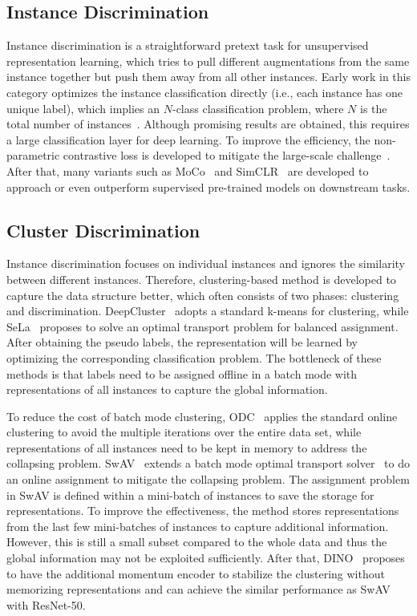 \documentclass[10pt,twocolumn,letterpaper]{article}
\begin{document}
\subsection{Instance Discrimination}
Instance discrimination is a straightforward pretext task for unsupervised representation learning, which tries to pull different augmentations from the same instance together but push them away from all other instances. Early work in this category optimizes the instance classification directly (i.e., each instance has one unique label), which implies an $N$-class classification problem, where $N$ is the total number of instances~\cite{DosovitskiyFSRB16}. Although promising results are obtained, this requires a large classification layer for deep learning. To improve the efficiency, the non-parametric contrastive loss is developed to mitigate the large-scale challenge~\cite{WuXYL18}. After that, many variants such as MoCo~\cite{He0WXG20,abs-2003-04297,abs-2104-02057} and SimCLR~\cite{ChenK0H20} are developed to approach or even outperform supervised pre-trained models on downstream tasks.

\subsection{Cluster Discrimination}
Instance discrimination focuses on individual instances and ignores the similarity between different instances. Therefore, clustering-based method is developed to capture the data structure better, which often consists of two phases: clustering and discrimination. DeepCluster~\cite{CaronBJD18} adopts a standard k-means for clustering, while SeLa~\cite{AsanoRV20a} proposes to solve an optimal transport problem for balanced assignment. After obtaining the pseudo labels, the representation will be learned by optimizing the corresponding classification problem. The bottleneck of these methods is that labels need to be assigned offline in a batch mode with representations of all instances to capture the global information. 

To reduce the cost of batch mode clustering, ODC~\cite{ZhanX0OL20} applies the standard online clustering to avoid the multiple iterations over the entire data set, while representations of all instances need to be kept in memory to address the collapsing problem. SwAV~\cite{CaronMMGBJ20} extends a batch mode optimal transport solver~\cite{AsanoRV20a} to do an online assignment to mitigate the collapsing problem. The assignment problem in SwAV is defined within a mini-batch of instances to save the storage for representations. To improve the effectiveness, the method stores representations from the last few mini-batches of instances to capture additional information. However, this is still a small subset compared to the whole data and thus the global information may not be exploited sufficiently. After that, DINO~\cite{abs-2104-14294} proposes to have the additional momentum encoder to stabilize the clustering without memorizing representations and can achieve the similar performance as SwAV with ResNet-50. 
\end{document}
